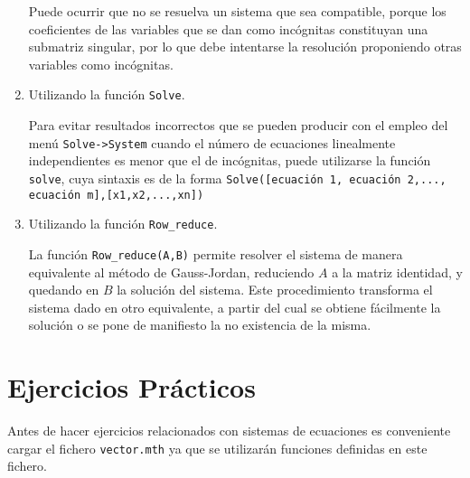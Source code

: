 \documentclass[a4paper]{article}
\begin{document}
\begin{enumerate}
Puede ocurrir que no se resuelva un sistema que sea compatible, porque los coeficientes de las variables que se dan como incógnitas constituyan una submatriz singular, por lo que debe intentarse la resolución proponiendo otras variables como incógnitas.

\item Utilizando la función \texttt{Solve}.

Para evitar resultados incorrectos que se pueden producir con el empleo del menú \texttt{Solve->System} cuando el número de ecuaciones linealmente independientes es menor que el de incógnitas, puede utilizarse la función \texttt{solve}, cuya sintaxis es de la forma \texttt{Solve([ecuación 1, ecuación 2,..., ecuación m],[x1,x2,...,xn])}

\item Utilizando la función \texttt{Row\_reduce}.

La función \texttt{Row\_reduce(A,B)} permite resolver el sistema de manera equivalente al método de Gauss-Jordan,  reduciendo $A$ a la matriz identidad, y quedando en $B$ la solución del sistema. Este procedimiento transforma el sistema dado en otro equivalente, a partir del cual se obtiene fácilmente la solución o se pone de manifiesto la no existencia de la misma.

\end{enumerate}


\section*{Ejercicios Prácticos}

Antes de hacer ejercicios relacionados con sistemas de ecuaciones es conveniente cargar el fichero \texttt{vector.mth} ya que se utilizarán funciones definidas en este fichero. 
\end{document}
